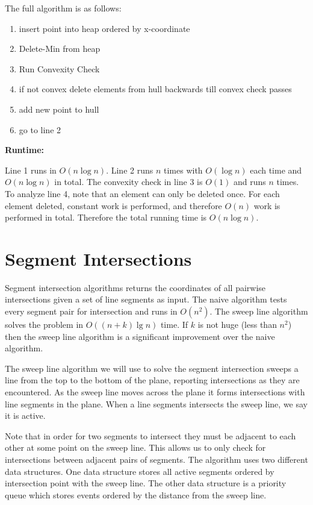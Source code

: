 \documentclass{article}
\begin{document}
The full algorithm is as follows:

\begin{enumerate}
\item insert point into heap ordered by x-coordinate
\item Delete-Min from heap
\item Run Convexity Check
\item if not convex delete elements from hull backwards till convex check passes
\item add new point to hull
\item go to line 2
\end{enumerate}

\textbf{Runtime:}

Line 1 runs in $O(n \log n)$. Line 2 runs $n$ times with $O(\log n)$ each time and $O(n \log n)$ in total. The convexity check in line 3 is $O(1)$ and runs $n$ times. To analyze line 4, note that an element can only be deleted once. For each element deleted, constant work is performed, and therefore $O(n)$ work is performed in total. Therefore the total running time is $O(n \log n)$.


\section{Segment Intersections}

Segment intersection algorithms returns the coordinates of all pairwise intersections given a set of line segments as input. The naive algorithm tests every segment pair for intersection and runs in $O(n^2)$. The sweep line algorithm solves the problem in $O((n + k) \lg n)$ time. If $k$ is not huge (less than $n^2$) then the sweep line algorithm is a significant improvement over the naive algorithm. 

The sweep line algorithm we will use to solve the segment intersection sweeps a line from the top to the bottom of the plane, reporting intersections as they are encountered. As the sweep line moves across the plane it forms intersections with line segments in the plane. When a line segments intersects the sweep line, we say it is active. 

Note that in order for two segments to intersect they must be adjacent to each other at some point on the sweep line. This allows us to only check for intersections between adjacent pairs of segments. The algorithm uses two different data structures. One data structure stores all active segments ordered by intersection point with the sweep line. The other data structure is a priority queue which stores events ordered by the distance from the sweep line.
\end{document}

